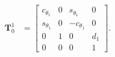 \documentclass{beamer}
\begin{document}
\begin{align}
    \mathbf{T}^{1}_{0} &=\begin{bmatrix}
        c_{\theta_{1}} & 0 & s_{\theta_{1}} & 0 \\
         s_{\theta_{1}} & 0 & -c_{\theta_{1}} & 0 \\
         0 & 1 & 0 &d_{1} \\
         0 & 0 &0 & 1
    \end{bmatrix}.
\end{align}
\end{document}
